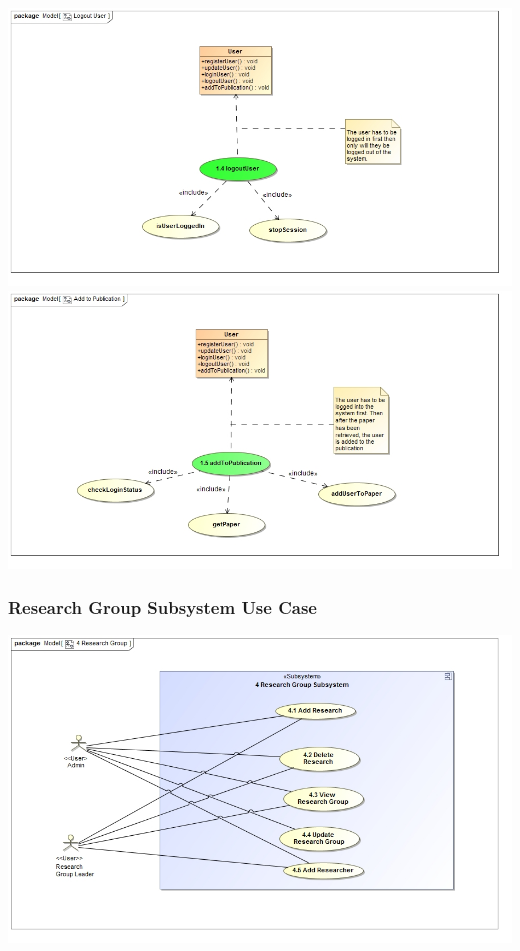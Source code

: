 \documentclass{article}
\begin{document}
				\includegraphics[width=\textwidth]{LogoutUser}
				\includegraphics[width=\textwidth]{AddtoPublication}
			\subsubsection{Research Group Subsystem Use Case}
				\includegraphics[width=\textwidth]{ResearchGroup}
\end{document}
